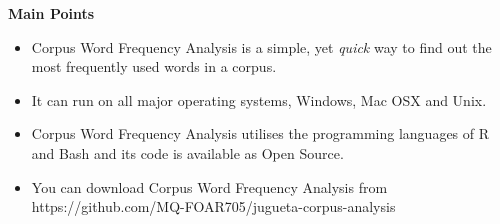 \documentclass[unknownkeysallowed,usepdftitle=false,aspectratio=169, parskip=full]{beamer}
\newcommand{\secvariable}{nothing}
\newcommand{\mysection}[1]{\renewcommand{\secvariable}{#1}
}
\begin{document}
\mysection{conclusion}
\begin{frame}\label{\secvariable}
  \textbf{Main Points}
  \begin{itemize}
  \item Corpus Word Frequency Analysis is a simple, yet \emph{quick} way to find out the most frequently used words in a corpus. 
  \item It can run on all major operating systems, Windows, Mac OSX and Unix.
  \item Corpus Word Frequency Analysis utilises the programming languages of R and Bash and its code is available as Open Source.
  \item You can download Corpus Word Frequency Analysis from https://github.com/MQ-FOAR705/jugueta-corpus-analysis

  \end{itemize}

  
\end{frame}
\end{document}
